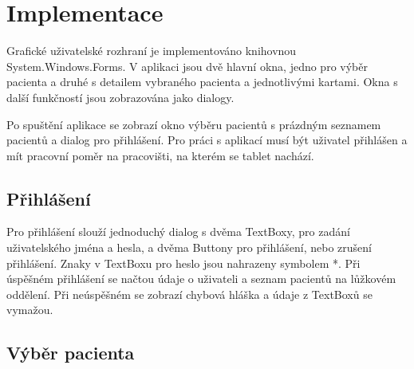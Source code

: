 \chapter{Implementace}

Grafické uživatelské rozhraní je implementováno knihovnou System.Windows.Forms. V aplikaci jsou dvě hlavní okna, jedno pro výběr pacienta a druhé s detailem vybraného pacienta a jednotlivými kartami. Okna s další funkčností jsou zobrazována jako dialogy.

Po spuštění aplikace se zobrazí okno výběru pacientů s prázdným seznamem pacientů a dialog pro přihlášení. Pro práci s aplikací musí být uživatel přihlášen a mít pracovní poměr na pracovišti, na kterém se tablet nachází.


\section{Přihlášení}

Pro přihlášení slouží jednoduchý dialog s dvěma TextBoxy, pro zadání uživatelského jména a hesla, a dvěma Buttony pro přihlášení, nebo zrušení přihlášení. Znaky v TextBoxu pro heslo jsou nahrazeny symbolem *. Při úspěšném přihlášení se načtou údaje o uživateli a seznam pacientů na lůžkovém oddělení. Při neúspěšném se zobrazí chybová hláška a údaje z TextBoxů se vymažou.


\section{Výběr pacienta}

